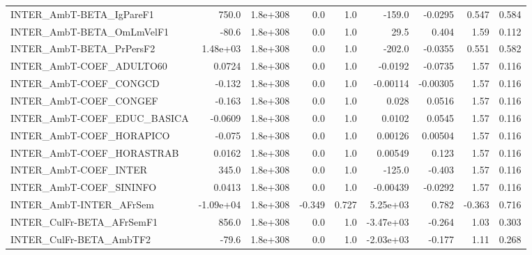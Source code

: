 \begin{tabular}{lrrrrrrrr}
INTER\_AmbT-BETA\_IgPareF1              &       750.0 &     1.8e+308 &     0.0 &      1.0 &     -159.0 &     -0.0295 &        0.547 &         0.584 \\
INTER\_AmbT-BETA\_OmLmVelF1             &       -80.6 &     1.8e+308 &     0.0 &      1.0 &       29.5 &       0.404 &         1.59 &         0.112 \\
INTER\_AmbT-BETA\_PrPersF2              &    1.48e+03 &     1.8e+308 &     0.0 &      1.0 &     -202.0 &     -0.0355 &        0.551 &         0.582 \\
INTER\_AmbT-COEF\_ADULTO60              &      0.0724 &     1.8e+308 &     0.0 &      1.0 &    -0.0192 &     -0.0735 &         1.57 &         0.116 \\
INTER\_AmbT-COEF\_CONGCD                &      -0.132 &     1.8e+308 &     0.0 &      1.0 &   -0.00114 &    -0.00305 &         1.57 &         0.116 \\
INTER\_AmbT-COEF\_CONGEF                &      -0.163 &     1.8e+308 &     0.0 &      1.0 &      0.028 &      0.0516 &         1.57 &         0.116 \\
INTER\_AmbT-COEF\_EDUC\_BASICA           &     -0.0609 &     1.8e+308 &     0.0 &      1.0 &     0.0102 &      0.0545 &         1.57 &         0.116 \\
INTER\_AmbT-COEF\_HORAPICO              &      -0.075 &     1.8e+308 &     0.0 &      1.0 &    0.00126 &     0.00504 &         1.57 &         0.116 \\
INTER\_AmbT-COEF\_HORASTRAB             &      0.0162 &     1.8e+308 &     0.0 &      1.0 &    0.00549 &       0.123 &         1.57 &         0.116 \\
INTER\_AmbT-COEF\_INTER                 &       345.0 &     1.8e+308 &     0.0 &      1.0 &     -125.0 &      -0.403 &         1.57 &         0.116 \\
INTER\_AmbT-COEF\_SININFO               &      0.0413 &     1.8e+308 &     0.0 &      1.0 &   -0.00439 &     -0.0292 &         1.57 &         0.116 \\
INTER\_AmbT-INTER\_AFrSem               &   -1.09e+04 &     1.8e+308 &  -0.349 &    0.727 &   5.25e+03 &       0.782 &       -0.363 &         0.716 \\
INTER\_CulFr-BETA\_AFrSemF1             &       856.0 &     1.8e+308 &     0.0 &      1.0 &  -3.47e+03 &      -0.264 &         1.03 &         0.303 \\
INTER\_CulFr-BETA\_AmbTF2               &       -79.6 &     1.8e+308 &     0.0 &      1.0 &  -2.03e+03 &      -0.177 &         1.11 &         0.268 \\

\end{tabular}
